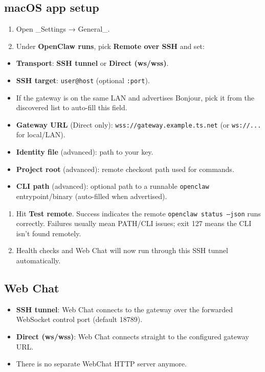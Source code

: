 \subsection{macOS app setup}


\begin{enumerate}
  \item Open \_Settings → General\_.
  \item Under \textbf{OpenClaw runs}, pick \textbf{Remote over SSH} and set:
\end{enumerate}

\begin{itemize}
  \item \textbf{Transport}: \textbf{SSH tunnel} or \textbf{Direct (ws/wss)}.
  \item \textbf{SSH target}: \texttt{user@host} (optional \texttt{:port}).
  \item If the gateway is on the same LAN and advertises Bonjour, pick it from the discovered list to auto-fill this field.
  \item \textbf{Gateway URL} (Direct only): \texttt{wss://gateway.example.ts.net} (or \texttt{ws://...} for local/LAN).
  \item \textbf{Identity file} (advanced): path to your key.
  \item \textbf{Project root} (advanced): remote checkout path used for commands.
  \item \textbf{CLI path} (advanced): optional path to a runnable \texttt{openclaw} entrypoint/binary (auto-filled when advertised).
\end{itemize}

\begin{enumerate}
  \item Hit \textbf{Test remote}. Success indicates the remote \texttt{openclaw status --json} runs correctly. Failures usually mean PATH/CLI issues; exit 127 means the CLI isn’t found remotely.
  \item Health checks and Web Chat will now run through this SSH tunnel automatically.
\end{enumerate}


\subsection{Web Chat}


\begin{itemize}
  \item \textbf{SSH tunnel}: Web Chat connects to the gateway over the forwarded WebSocket control port (default 18789).
  \item \textbf{Direct (ws/wss)}: Web Chat connects straight to the configured gateway URL.
  \item There is no separate WebChat HTTP server anymore.
\end{itemize}


